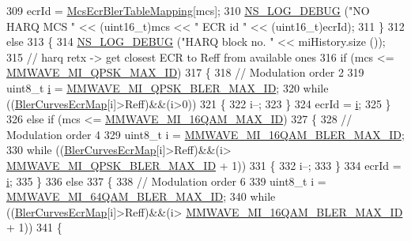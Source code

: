 \begin{DoxyCode}
309       ecrId = \hyperlink{namespacens3_ad41f52d74f41546bde1a5d00c1eed016}{McsEcrBlerTableMapping}[mcs];
310       \hyperlink{group__logging_ga413f1886406d49f59a6a0a89b77b4d0a}{NS\_LOG\_DEBUG} (\textcolor{stringliteral}{"NO HARQ MCS "} << (uint16\_t)mcs << \textcolor{stringliteral}{" ECR id "} << (uint16\_t)ecrId);
311     \}
312   \textcolor{keywordflow}{else}
313     \{
314       \hyperlink{group__logging_ga413f1886406d49f59a6a0a89b77b4d0a}{NS\_LOG\_DEBUG} (\textcolor{stringliteral}{"HARQ block no. "} << miHistory.size ());
315       \textcolor{comment}{// harq retx -> get closest ECR to Reff from available ones}
316       \textcolor{keywordflow}{if} (mcs <= \hyperlink{namespacens3_a08725fa6d069486f1625e23b79f05327}{MMWAVE\_MI\_QPSK\_MAX\_ID})
317         \{
318           \textcolor{comment}{// Modulation order 2}
319           uint8\_t \hyperlink{bernuolliDistribution_8m_a6f6ccfcf58b31cb6412107d9d5281426}{i} = \hyperlink{namespacens3_ac41c162344e2a292e1ffec45a90018d5}{MMWAVE\_MI\_QPSK\_BLER\_MAX\_ID};
320           \textcolor{keywordflow}{while} ((\hyperlink{namespacens3_aea9df233b95c667ad4b2249bfb203f64}{BlerCurvesEcrMap}[i]>Reff)&&(i>0))
321             \{
322               i--;
323             \}
324           ecrId = \hyperlink{bernuolliDistribution_8m_a6f6ccfcf58b31cb6412107d9d5281426}{i};
325         \}
326       \textcolor{keywordflow}{else} \textcolor{keywordflow}{if} (mcs <= \hyperlink{namespacens3_accc1be2d986d75b75bfc1e6ab577d74a}{MMWAVE\_MI\_16QAM\_MAX\_ID})
327         \{
328           \textcolor{comment}{// Modulation order 4}
329           uint8\_t i = \hyperlink{namespacens3_aef6c2aa1bc5c09f0f18e7dfcf548516a}{MMWAVE\_MI\_16QAM\_BLER\_MAX\_ID};
330           \textcolor{keywordflow}{while} ((\hyperlink{namespacens3_aea9df233b95c667ad4b2249bfb203f64}{BlerCurvesEcrMap}[i]>Reff)&&(i>
      \hyperlink{namespacens3_ac41c162344e2a292e1ffec45a90018d5}{MMWAVE\_MI\_QPSK\_BLER\_MAX\_ID} + 1))
331             \{
332               i--;
333             \}
334           ecrId = \hyperlink{bernuolliDistribution_8m_a6f6ccfcf58b31cb6412107d9d5281426}{i};
335         \}
336       \textcolor{keywordflow}{else}
337         \{
338           \textcolor{comment}{// Modulation order 6}
339           uint8\_t i = \hyperlink{namespacens3_afe698c6008741230916101525da201c3}{MMWAVE\_MI\_64QAM\_BLER\_MAX\_ID};
340           \textcolor{keywordflow}{while} ((\hyperlink{namespacens3_aea9df233b95c667ad4b2249bfb203f64}{BlerCurvesEcrMap}[i]>Reff)&&(i>
      \hyperlink{namespacens3_aef6c2aa1bc5c09f0f18e7dfcf548516a}{MMWAVE\_MI\_16QAM\_BLER\_MAX\_ID} + 1))
341             \{

\end{DoxyCode}
